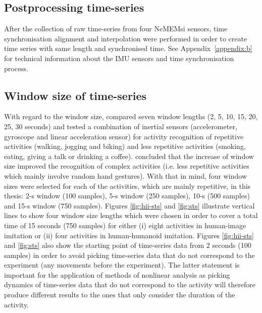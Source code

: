 \subsection{Postprocessing time-series}
After the collection of raw time-series from four NeMEMsi sensors,
time synchronisation alignment and interpolation were performed 
in order to create time series with same length and synchronised time.
See Appendix~\ref{appendix:b} for technical information 
about the IMU sensors and time synchronisation process.

\subsection{Window size of time-series}
With regard to the window size, \cite{shoaib2016} compared 
seven window lengths (2, 5, 10, 15, 20, 25, 30 seconds)
and tested a combination of inertial sensors (accelerometer, gyroscope and linear 
acceleration sensor) for activity recognition of repetitive 
activities (walking, jogging and biking) and less repetitive activities 
(smoking, eating, giving a talk or drinking a coffee).
\cite{shoaib2016} concluded that the increase of window size 
improved the recognition of complex activities (i.e. less repetitive 
activities which mainly involve random hand gestures).
With that in mind, four window sizes were selected 
for each of the activities, which are mainly repetitive, in this thesis: 
2-s window (100 samples), 
5-s window (250 samples), 
10-s (500 samples) and 
15-s window (750 samples).
Figures \ref{fig:hii-sts} and \ref{fig:sts} illustrate  
vertical lines to show four window size lengths which 
were chosen in order to cover a total time of 15 seconds (750 samples)
for either
(i) eight activities in human-image imitation 
or (ii) four activities in human-humanoid imitation.
Figures \ref{fig:hii-sts} and \ref{fig:sts} also show 
the starting point of time-series data from 2 seconds (100 samples) 
in order to avoid picking time-series data 
that do not correspond to the experiment 
(any movements before the experiment).
The latter statement is important for the application of methods
of nonlinear analysis as picking dynamics of time-series data 
that do not correspond to the activity
will therefore produce different results to the ones 
that only consider the duration of the activity. 

